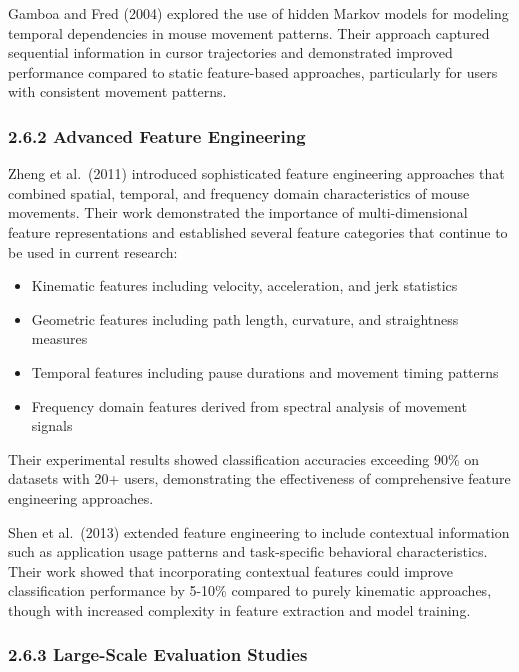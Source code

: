 \documentclass[
  11pt,
  a4paper,
]{article}
\providecommand{\tightlist}{%
  \setlength{\itemsep}{0pt}\setlength{\parskip}{0pt}}
\begin{document}
Gamboa and Fred (2004) explored the use of hidden Markov models for
modeling temporal dependencies in mouse movement patterns. Their
approach captured sequential information in cursor trajectories and
demonstrated improved performance compared to static feature-based
approaches, particularly for users with consistent movement patterns.

\subsubsection{2.6.2 Advanced Feature
Engineering}\label{advanced-feature-engineering}

Zheng et al.~(2011) introduced sophisticated feature engineering
approaches that combined spatial, temporal, and frequency domain
characteristics of mouse movements. Their work demonstrated the
importance of multi-dimensional feature representations and established
several feature categories that continue to be used in current research:

\begin{itemize}
\tightlist
\item
  Kinematic features including velocity, acceleration, and jerk
  statistics
\item
  Geometric features including path length, curvature, and straightness
  measures
\item
  Temporal features including pause durations and movement timing
  patterns
\item
  Frequency domain features derived from spectral analysis of movement
  signals
\end{itemize}

Their experimental results showed classification accuracies exceeding
90\% on datasets with 20+ users, demonstrating the effectiveness of
comprehensive feature engineering approaches.

Shen et al.~(2013) extended feature engineering to include contextual
information such as application usage patterns and task-specific
behavioral characteristics. Their work showed that incorporating
contextual features could improve classification performance by 5-10\%
compared to purely kinematic approaches, though with increased
complexity in feature extraction and model training.

\subsubsection{2.6.3 Large-Scale Evaluation
Studies}\label{large-scale-evaluation-studies}
\end{document}
